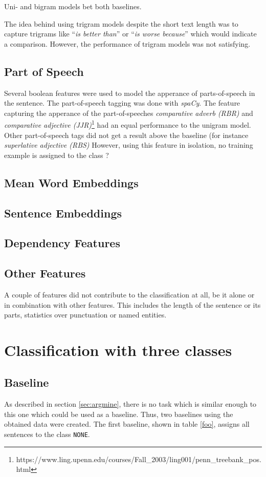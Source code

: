 Uni- and bigram models bet both baselines.

The idea behind using trigram models despite the short text length was to capture trigrams like \enquote{\emph{is better than}} or \enquote{\emph{is worse because}} which would indicate a comparison. However, the performance of trigram models was not satisfying.
\label{sec:ngrams}

\subsection{Part of Speech}
Several boolean features were used to model the apperance of parts-of-speech in the sentence. The part-of-speech tagging was done with \emph{spaCy}. The feature capturing the apperance of the part-of-speeches \emph{comparative adverb (RBR)} and \emph{comparative adjective (JJR)}\footnote{https://www.ling.upenn.edu/courses/Fall\_2003/ling001/penn\_treebank\_pos.html} had an equal performance to the unigram model. Other part-of-speech tags did not get a result above the baseline (for instance \emph{superlative adjective (RBS)} However, using this feature in isolation, no training example is assigned to the class ?

\subsection{Mean Word Embeddings}

\subsection{Sentence Embeddings}
\subsection{Dependency Features}
\subsection{Other Features}
A couple of features did not contribute to the classification at all, be it alone or in combination with other features. This includes the length of the sentence or its parts, statistics over punctuation or named entities.

\section{Classification with three classes}
\subsection{Baseline}
\label{sec:baseline}
As described in section \ref{sec:argmine}, there is no task which is similar enough to this one which could be used as a baseline. Thus, two baselines using the obtained data were created. The first baseline, shown in table \ref{foo}, assigns all sentences to the class \texttt{NONE}.

